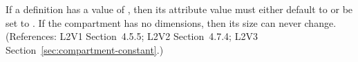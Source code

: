 If a \Compartment definition has a  value of
, then its  attribute value must either default to or be
set to .  If the compartment has no dimensions, then its size can
never change.  (References: L2V1 Section~4.5.5; L2V2 Section~4.7.4; L2V3
Section~\ref{sec:compartment-constant}.)
